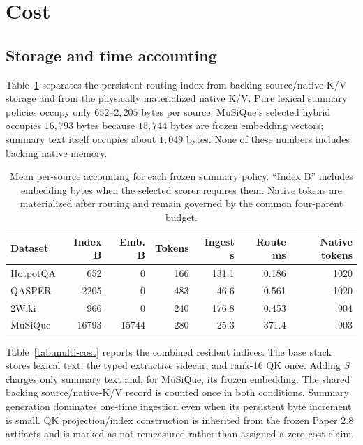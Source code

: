 \documentclass[11pt]{article}
\newcommand{\kv}{K/V\xspace}
\begin{document}
\section{Cost}

\subsection{Storage and time accounting}

Table~\ref{tab:cost} separates the persistent routing index from backing source/native-\kv storage and from the physically materialized native \kv. Pure lexical summary policies occupy only $652$--$2{,}205$ bytes per source. MuSiQue's selected hybrid occupies $16{,}793$ bytes because $15{,}744$ bytes are frozen embedding vectors; summary text itself occupies about $1{,}049$ bytes. None of these numbers includes backing native memory.

\begin{table}[H]
\centering
\small
\begin{tabular}{lrrrrrr}
\toprule
Dataset & Index B & Emb. B & Tokens & Ingest s & Route ms & Native tokens\\
\midrule
HotpotQA & 652 & 0 & 166 & 131.1 & 0.186 & 1020\\
QASPER & 2205 & 0 & 483 & 46.6 & 0.561 & 1020\\
2Wiki & 966 & 0 & 240 & 176.8 & 0.453 & 904\\
MuSiQue & 16793 & 15744 & 280 & 25.3 & 371.4 & 903\\
\bottomrule
\end{tabular}
\caption{Mean per-source accounting for each frozen summary policy. ``Index B'' includes embedding bytes when the selected scorer requires them. Native tokens are materialized after routing and remain governed by the common four-parent budget.}
\label{tab:cost}
\end{table}

Table~\ref{tab:multi-cost} reports the combined resident indices. The base
stack stores lexical text, the typed extractive sidecar, and rank-16 QK once.
Adding $S$ charges only summary text and, for MuSiQue, its frozen embedding.
The shared backing source/native-\kv record is counted once in both conditions.
Summary generation dominates one-time ingestion even when its persistent byte
increment is small. QK projection/index construction is inherited from the
frozen Paper 2.8 artifacts and is marked as not remeasured rather than assigned
a zero-cost claim.

\begin{table}[H]
\centering
\small

\caption{Mean persistent address bytes and measured summary ingestion time per
source. ``Base'' is $L+E+QK$ and ``+Summary'' is $L+E+S+QK$. Both use one shared
native-memory backing record.}
\label{tab:multi-cost}
\end{table}
\end{document}
